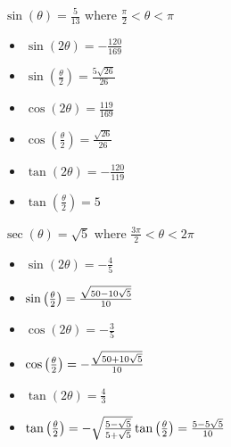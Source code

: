 \documentclass{ximera}
\begin{document}
\begin{question}
\begin{problem}
\begin{solution}
\begin{itemize}
\end{itemize}
\end{solution}
\end{problem}

\begin{problem}
$\sin(\theta) = \frac{5}{13}$ where $\frac{\pi}{2} < \theta < \pi$

\begin{solution}
\begin{itemize}

\item $\sin(2\theta) = -\frac{120}{169}$
\item $\sin\left(\frac{\theta}{2}\right) = \frac{5\sqrt{26}}{26}$
\item $\cos(2\theta) = \frac{119}{169}$
\item $\cos\left(\frac{\theta}{2}\right) = \frac{\sqrt{26}}{26}$
\item $\tan(2\theta)=-\frac{120}{119}$
\item $\tan\left(\frac{\theta}{2}\right) = 5$

\end{itemize}
\end{solution}
\end{problem}

\begin{problem}
$\sec(\theta) = \sqrt{5}$ where $\frac{3\pi}{2} < \theta < 2\pi$

\begin{solution}
\begin{itemize}

\item $\sin(2\theta) = -\frac{4}{5}$
\item $\sin\left(\frac{\theta}{2}\right) = \frac{\sqrt{50-10\sqrt{5}}}{10} \\ \phantom{\tan\left(\frac{\theta}{2}\right) =\frac{5-5\sqrt{5}}{10}}$ 

\item $\cos(2\theta) = -\frac{3}{5}$
\item $\cos\left(\frac{\theta}{2}\right)= -\frac{\sqrt{50+10\sqrt{5}}}{10} \\ \phantom{\tan\left(\frac{\theta}{2}\right) =\frac{5-5\sqrt{5}}{10}}$ 
\item $\tan(2\theta)=\frac{4}{3}$
\item $\tan\left(\frac{\theta}{2}\right) =  -\sqrt{\frac{5-\sqrt{5}}{5+\sqrt{5}}} \\ \tan\left(\frac{\theta}{2}\right) =\frac{5-5\sqrt{5}}{10}$


\end{itemize}
\end{solution}
\end{problem}
\end{question}
\end{document}
